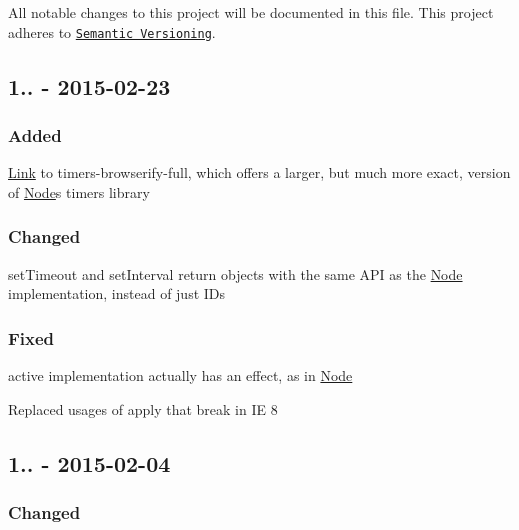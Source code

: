 All notable changes to this project will be documented in this file. This project adheres to \href{http://semver.org/}{\tt Semantic Versioning}.

\subsection*{1.. -\/ 2015-\/02-\/23}

\subsubsection*{Added}


\begin{DoxyItemize}
\item \mbox{\hyperlink{structLink}{Link}} to {\ttfamily timers-\/browserify-\/full}, which offers a larger, but much more exact, version of \mbox{\hyperlink{classNode}{Node}}\textquotesingle{}s {\ttfamily timers} library
\end{DoxyItemize}

\subsubsection*{Changed}


\begin{DoxyItemize}
\item {\ttfamily set\+Timeout} and {\ttfamily set\+Interval} return objects with the same A\+PI as the \mbox{\hyperlink{classNode}{Node}} implementation, instead of just I\+Ds
\end{DoxyItemize}

\subsubsection*{Fixed}


\begin{DoxyItemize}
\item {\ttfamily active} implementation actually has an effect, as in \mbox{\hyperlink{classNode}{Node}}
\item Replaced usages of {\ttfamily apply} that break in IE 8
\end{DoxyItemize}

\subsection*{1.. -\/ 2015-\/02-\/04}

\subsubsection*{Changed}


